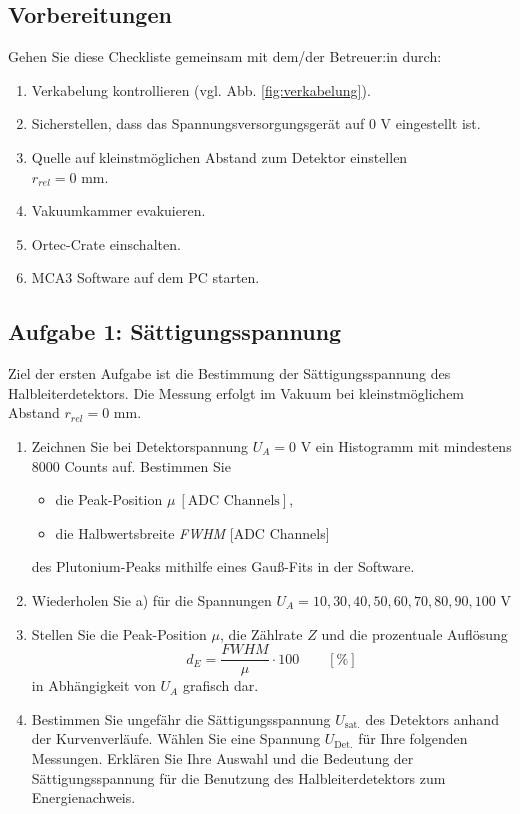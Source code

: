 \subsection{Vorbereitungen}
Gehen Sie diese Checkliste gemeinsam mit dem/der Betreuer:in durch:
\begin{enumerate}
	\item Verkabelung kontrollieren (vgl. Abb. \ref{fig:verkabelung}).
	\item Sicherstellen, dass das Spannungsversorgungsgerät auf $0$ V eingestellt ist.
	\item Quelle auf kleinstmöglichen Abstand zum Detektor einstellen \\$r_{rel} = 0$ mm.
	\item Vakuumkammer evakuieren.
	\item Ortec-Crate einschalten.
	\item MCA3 Software auf dem PC starten.
\end{enumerate}

%
\subsection{Aufgabe 1: Sättigungsspannung}
Ziel der ersten Aufgabe ist die Bestimmung der Sättigungsspannung des Halbleiterdetektors. Die Messung erfolgt im Vakuum bei kleinstmöglichem Abstand $r_{rel} = 0$ mm.
\begin{enumerate}[label=\textbf{\alph*)}]
	\item Zeichnen Sie bei Detektorspannung $U_A = 0$ V ein Histogramm mit mindestens 8000 Counts auf. Bestimmen Sie 
		\begin{itemize}[nosep]
		\item die Peak-Position $\mu\ [\text{ADC Channels}]$,
		\item die Halbwertsbreite \textit{FWHM} [ADC Channels]
	\end{itemize}
	des Plutonium-Peaks mithilfe eines Gauß-Fits in der Software.
	\item Wiederholen Sie a) für die Spannungen $U_A = 10, 30, 40, 50, 60, 70, 80, 90, 100$ V
	\item Stellen Sie die Peak-Position $\mu$, die Zählrate $Z$ und die prozentuale Auflösung
		\begin{equation}
			d_E = \frac{\textit{FWHM}}{\mu} \cdot 100 \qquad [\%]
		\end{equation}
		in Abhängigkeit von $U_A$ grafisch dar.
	\item Bestimmen Sie ungefähr die Sättigungsspannung $U_{\text{sat.}}$ des Detektors anhand der Kurvenverläufe. Wählen Sie eine Spannung $U_{\text{Det.}}$ für Ihre folgenden Messungen. Erklären Sie Ihre Auswahl und die Bedeutung der Sättigungsspannung für die Benutzung des Halbleiterdetektors zum Energienachweis.
\end{enumerate}

